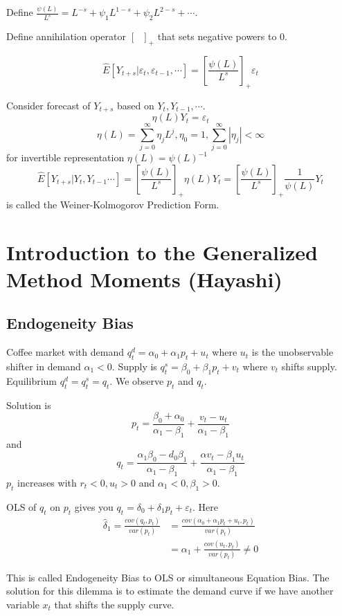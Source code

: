 \documentclass[11pt, a4paper, oneside]{article}
\theoremstyle{definition}
\theoremstyle{proposition}
\theoremstyle{corollary}
\theoremstyle{lemma}
\theoremstyle{theorem}
\begin{document}
Define $\frac{\psi(L)}{L^s} = L^{-s} + \psi_1 L^{1-s}+\psi_2 L^{2-s}+\cdots$. 

Define annihilation operator $[\text{ }]_+$ that sets negative powers to 0. 

$$\hat{E}[Y_{t+s}|\varepsilon_t, \varepsilon_{t-1}, \cdots] =\left[ \frac{\psi(L)}{L^s}\right]_+ \varepsilon_t$$

Consider 
forecast of $Y_{t+s}$ based on $Y_t, Y_{t-1}, \cdots$. 
$$\eta(L)Y_t = \varepsilon_t$$
$$\eta(L) = \sum_{j=0}^{\infty}\eta_j L^j, \eta_0 = 1, \sum_{j=0}^{\infty} |\eta_j| < \infty$$
for invertible representation $\eta(L) = \psi(L)^{-1}$
$$\hat{E}[Y_{t+s}|Y_t, Y_{t -1}\cdots] = \left[ \frac{\psi(L)}{L^s}\right]_+ \eta(L) Y_t = \left[ \frac{\psi(L)}{L^s}\right]_+ \frac{1}{\psi(L)} Y_t$$
is called the Weiner-Kolmogorov Prediction Form. 

\section{Introduction to the Generalized Method Moments (Hayashi)}
\subsection{Endogeneity Bias}
Coffee market with demand $q_t^d = \alpha_0 + \alpha_1 p_t + u_t$ where $u_t$ is the unobservable shifter in demand $\alpha_1 < 0$. Supply is $q_t^s = \beta_0+\beta_1 p_t + v_t$ where $v_t$ shifts supply. Equilibrium $q_t^d = q_t^s = q_t$. We observe $p_t$ and $q_t$.

Solution is $$p_t = \frac{\beta_0 + \alpha_0}{\alpha_1 - \beta_1} + \frac{v_t - u_t}{\alpha_1 - \beta_1}$$ and $$q_t = \frac{\alpha_1 \beta_0 - d_0\beta_1}{\alpha_1 - \beta_1} + \frac{\alpha v_t - \beta_1 u_t}{\alpha_1 - \beta_1}$$
$p_t$ increases with $r_t < 0, u_t>0$ and $\alpha_1 < 0, \beta_1> 0$.

OLS of $q_t$ on $p_t$ gives you $q_t = \delta_0 + \delta_1p_t + \varepsilon_t$. Here 
\begin{align*}
\hat{\delta}_1= \frac{cov(q_t, p_t)}{var(p_t)} &= \frac{cov(\alpha_0+\alpha_1p_t+u_t, p_t)}{var(p_t)}\\
&=\alpha_1 + \frac{cov(u_t, p_t)}{var(p_t)} \neq 0
\end{align*}

This is called Endogeneity Bias to OLS or simultaneous Equation Bias. The solution for this dilemma is to estimate the demand curve if we have another variable $x_t$ that shifts the supply curve. 
\end{document}

